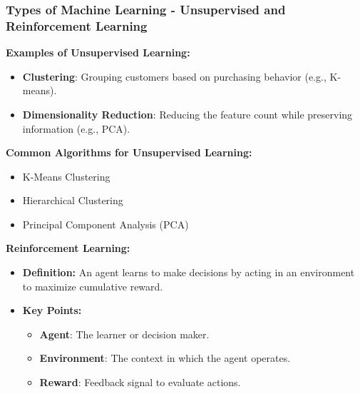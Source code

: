 \documentclass[aspectratio=169]{beamer}
\begin{document}
\begin{frame}[fragile]
    \frametitle{Types of Machine Learning - Unsupervised and Reinforcement Learning}
    \textbf{Examples of Unsupervised Learning:}
    \begin{itemize}
        \item \textbf{Clustering}: Grouping customers based on purchasing behavior (e.g., K-means).
        \item \textbf{Dimensionality Reduction}: Reducing the feature count while preserving information (e.g., PCA).
    \end{itemize}

    \textbf{Common Algorithms for Unsupervised Learning:}
    \begin{itemize}
        \item K-Means Clustering
        \item Hierarchical Clustering
        \item Principal Component Analysis (PCA)
    \end{itemize}

    \textbf{Reinforcement Learning:}
    \begin{itemize}
        \item \textbf{Definition:} An agent learns to make decisions by acting in an environment to maximize cumulative reward.
        \item \textbf{Key Points:}
        \begin{itemize}
            \item \textbf{Agent}: The learner or decision maker.
            \item \textbf{Environment}: The context in which the agent operates.
            \item \textbf{Reward}: Feedback signal to evaluate actions.
        \end{itemize}
    \end{itemize}
\end{frame}
\end{document}
